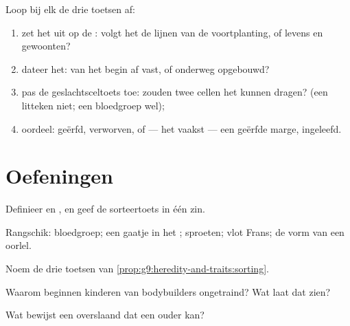 \begin{method}\label{met:g9:heredity-and-traits:audit}
Loop bij elk  de drie toetsen af:
\begin{enumerate}
  \item zet het uit op de : volgt het de lijnen van de
        voortplanting, of levens en gewoonten?
  \item dateer het: van het begin af vast, of onderweg
        opgebouwd?
  \item pas de geslachtsceltoets toe: zouden twee cellen het
        kunnen dragen? (een litteken niet; een bloedgroep wel);
  \item oordeel: geërfd, verworven, of --- het vaakst --- een
        geërfde marge, ingeleefd.
\end{enumerate}
\end{method}

\section{Oefeningen}

\begin{exercise}[$\star$]\label{exo:g9:heredity-and-traits:1}
Definieer  en , en geef de sorteertoets in
één zin.
\end{exercise}

\begin{exercise}[$\star$]\label{exo:g9:heredity-and-traits:2}
Rangschik: bloedgroep; een gaatje in het ; sproeten; vlot
Frans; de vorm van een oorlel.
\end{exercise}

\begin{exercise}[$\star$]\label{exo:g9:heredity-and-traits:3}
Noem de drie toetsen van
\cref{prop:g9:heredity-and-traits:sorting}.
\end{exercise}

\begin{exercise}[$\star$]\label{exo:g9:heredity-and-traits:4}
Waarom beginnen kinderen van bodybuilders ongetraind? Wat
laat dat zien?
\end{exercise}

\begin{exercise}[$\star$]\label{exo:g9:heredity-and-traits:5}
Wat bewijst een overslaand  dat een ouder kan?
\end{exercise}

